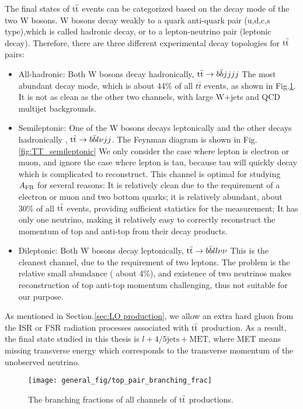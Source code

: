 The final states of $\mathrm{t}\bar{\mathrm{t}}$ events can be categorized based on the decay mode of the two W bosons. W bosons decay weakly to a quark anti-quark pair (u,d,c,s type),which is called hadronic decay, or to a lepton-neutrino pair (leptonic decay).  Therefore, there are three different experimental decay topologies for $\mathrm{t}\bar{\mathrm{t}}$ pairs:
 \begin{itemize}
 	\item All-hadronic: Both W bosons decay hadronically, $\mathrm{t}\bar{\mathrm{t}}\rightarrow b \bar b jjjj$
 	\subitem The most abundant decay mode, which is about 44\% of all $t\bar t$ events, as shown in Fig.\ref{fig:TT_composition}. It is not as clean as the other two channels, with large W+jets and QCD multijet backgrounds.
 	\item Semileptonic: One of the W bosons decays leptonically and the other decays hadronically , $\mathrm{t}\bar{\mathrm{t}} \rightarrow b\bar b l\nu j j$.  The Feynman diagram is shown in Fig.\ref{fig:TT_semileptonic}
 	\subitem We only consider the case where lepton is electron or muon, and ignore the case where lepton is tau, because tau will quickly decay which is complicated to reconstruct. 
 	\subitem This channel is optimal for studying $A_{\mathrm{FB}}$ for several reasons: It is relatively clean due to the requirement of a electron or muon and two bottom quarks; it is relatively abundant, about 30\% of all $\mathrm{t}\bar{\mathrm{t}}$ events, providing sufficient statistics for the measurement; It has only one neutrino, making it relatively easy to correctly reconstruct the momentum of top and anti-top from their decay products.  
 	\item Dileptonic: Both W bosons decay leptonically, $\mathrm{t}\bar{\mathrm{t}} \rightarrow b \bar b ll\nu\nu$
 	\subitem This is the cleanest channel, due to the requirement of two leptons. The problem is the relative small abundance ( about 4\%), and existence of two neutrinos makes reconstruction of top anti-top momentum challenging, thus not suitable for our purpose.  
 \end{itemize}  

As mentioned in Section.\ref{sec:LO production}, we allow an extra hard gluon from the ISR or FSR radiation processes associated with $\mathrm{t}\bar{\mathrm{t}}$ production. As a result, the final state studied in this thesis is $l+4/5\mathrm{jets}+\mathrm{MET}$, where MET means missing transverse energy which corresponds to the transverse momentum of the unobserved neutrino. 

\begin{figure}[hbt]
	\begin{center}
		\texttt{[image: general\_fig/top\_pair\_branching\_frac]}
		\caption{\small The branching fractions of all channels of $\mathrm{t}\bar{\mathrm{t}}$ productions.}
		\label{fig:TT_composition}
	\end{center}
\end{figure}

